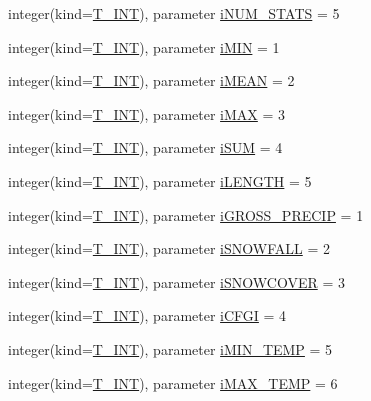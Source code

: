 \begin{DoxyCompactItemize}
\item 
integer(kind=\hyperlink{namespacetypes_a4e4d040a4425196c4d43be63e7e6103a}{T\_\-INT}), parameter \hyperlink{namespacetypes_a4c56fb4b9e90eaa04e36102300d88ba6}{iNUM\_\-STATS} = 5
\item 
integer(kind=\hyperlink{namespacetypes_a4e4d040a4425196c4d43be63e7e6103a}{T\_\-INT}), parameter \hyperlink{namespacetypes_a996356f311868440012a452bc3d0a323}{iMIN} = 1
\item 
integer(kind=\hyperlink{namespacetypes_a4e4d040a4425196c4d43be63e7e6103a}{T\_\-INT}), parameter \hyperlink{namespacetypes_a65fde77ac5f489a0498cfd5cc6578bdf}{iMEAN} = 2
\item 
integer(kind=\hyperlink{namespacetypes_a4e4d040a4425196c4d43be63e7e6103a}{T\_\-INT}), parameter \hyperlink{namespacetypes_a2f0945d479ed3cf3287563bd4acb0f85}{iMAX} = 3
\item 
integer(kind=\hyperlink{namespacetypes_a4e4d040a4425196c4d43be63e7e6103a}{T\_\-INT}), parameter \hyperlink{namespacetypes_a0b92a69a1b38cb0319dfe59e72f8a7fc}{iSUM} = 4
\item 
integer(kind=\hyperlink{namespacetypes_a4e4d040a4425196c4d43be63e7e6103a}{T\_\-INT}), parameter \hyperlink{namespacetypes_a91d9c66c291dee92fc0284fa06fb6f73}{iLENGTH} = 5
\item 
integer(kind=\hyperlink{namespacetypes_a4e4d040a4425196c4d43be63e7e6103a}{T\_\-INT}), parameter \hyperlink{namespacetypes_a3c6dbb348b35ea04c6da1808e4eeb082}{iGROSS\_\-PRECIP} = 1
\item 
integer(kind=\hyperlink{namespacetypes_a4e4d040a4425196c4d43be63e7e6103a}{T\_\-INT}), parameter \hyperlink{namespacetypes_a216378a3ebd8c66d245fc2aca380e6c7}{iSNOWFALL} = 2
\item 
integer(kind=\hyperlink{namespacetypes_a4e4d040a4425196c4d43be63e7e6103a}{T\_\-INT}), parameter \hyperlink{namespacetypes_a14231f76d9ab4ada50ac11d2234209c3}{iSNOWCOVER} = 3
\item 
integer(kind=\hyperlink{namespacetypes_a4e4d040a4425196c4d43be63e7e6103a}{T\_\-INT}), parameter \hyperlink{namespacetypes_a26dd912760d99d5d582693dd2aad18b5}{iCFGI} = 4
\item 
integer(kind=\hyperlink{namespacetypes_a4e4d040a4425196c4d43be63e7e6103a}{T\_\-INT}), parameter \hyperlink{namespacetypes_a58eba3f16f91d9339380db844925820f}{iMIN\_\-TEMP} = 5
\item 
integer(kind=\hyperlink{namespacetypes_a4e4d040a4425196c4d43be63e7e6103a}{T\_\-INT}), parameter \hyperlink{namespacetypes_a041c6ea18472c36d80d58d451635e4dc}{iMAX\_\-TEMP} = 6

\end{DoxyCompactItemize}
